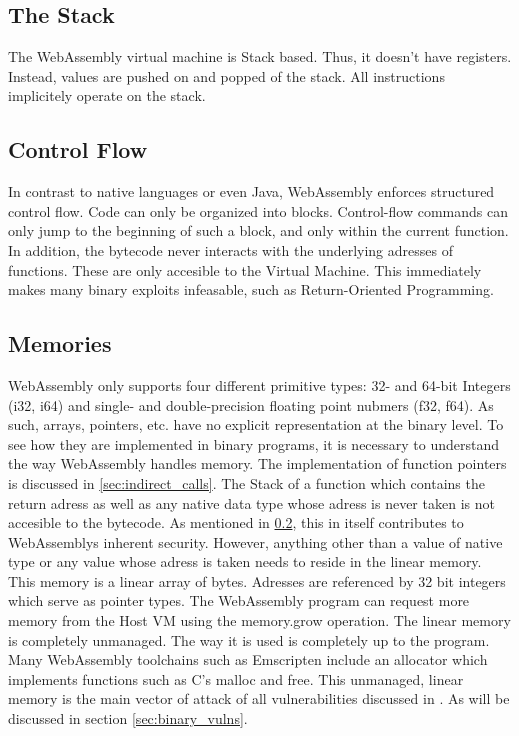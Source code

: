 \documentclass[sigconf]{acmart}
\begin{document}
\subsection{The Stack}
\label{sec:wasm_stack}
The WebAssembly virtual machine is Stack based. Thus, it doesn't have registers. Instead, values are pushed on and popped of the stack. All instructions implicitely operate on the stack. 

\subsection{Control Flow}
\label{sec:wasm_control_flow}
In contrast to native languages or even Java, WebAssembly enforces structured control flow. Code can only be organized into blocks. Control-flow commands can only jump to the beginning of such a block, and only within the current function. In addition, the bytecode never interacts with the underlying adresses of functions. These are only accesible to the Virtual Machine. This immediately makes many binary exploits infeasable, such as Return-Oriented Programming. 

\subsection{Memories} 
\label{sec:memories}
WebAssembly only supports four different primitive types: 32- and 64-bit Integers (i32, i64) and single- and double-precision floating point nubmers (f32, f64). As such, arrays, pointers, etc. have no explicit representation at the binary level. To see how they are implemented in binary programs, it is necessary to understand the way WebAssembly handles memory. The implementation of function pointers is discussed in \ref{sec:indirect_calls}. The Stack of a function which contains the return adress as well as any native data type whose adress is never taken is not accesible to the bytecode. As mentioned in \ref{sec:wasm_control_flow}, this in itself contributes to WebAssemblys inherent security. However, anything other than a value of native type or any value whose adress is taken needs to reside in the linear memory. This memory is a linear array of bytes. Adresses are referenced by 32 bit integers which serve as pointer types.   The WebAssembly program can request more memory from the Host VM using the memory.grow operation. The linear memory is completely unmanaged. The way it is used is completely up to the program. Many WebAssembly toolchains such as Emscripten include an allocator which implements functions such as C's malloc and free. This unmanaged, linear memory is the main vector of attack of all vulnerabilities discussed in \cite{lehmann_everything_2020}. As will be discussed in section  \ref{sec:binary_vulns}.
\end{document}
